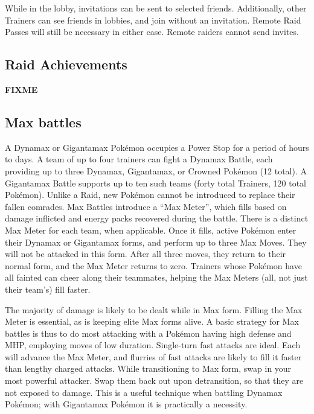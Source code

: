 While in the lobby, invitations can be sent to selected friends.
Additionally, other Trainers can see friends in lobbies, and join without an invitation.
Remote Raid Passes will still be necessary in either case.
Remote raiders cannot send invites.

\subsection{Raid Achievements}
\label{subsec:raidachievements}
\textbf{FIXME}

\subsection{Max battles}
\label{sec:maxbattles}
A Dynamax or Gigantamax Pokémon occupies a Power Stop for a period of hours to days.
A team of up to four trainers can fight a Dynamax Battle, each providing up to
  three Dynamax, Gigantamax, or Crowned Pokémon (12 total).
A Gigantamax Battle supports up to ten such teams (forty total Trainers, 120 total Pokémon).
Unlike a Raid, new Pokémon cannot be introduced to replace their fallen comrades.
Max Battles introduce a ``Max Meter'', which fills based on damage inflicted and
  energy packs recovered during the battle.
There is a distinct Max Meter for each team, when applicable.
Once it fills, active Pokémon enter their Dynamax or Gigantamax forms, and perform
  up to three Max Moves.
They will not be attacked in this form.
After all three moves, they return to their normal form, and the Max Meter returns to zero.
Trainers whose Pokémon have all fainted can cheer along their teammates,
  helping the Max Meters (all, not just their team's) fill faster.

The majority of damage is likely to be dealt while in Max form.
Filling the Max Meter is essential, as is keeping elite Max forms alive.
A basic strategy for Max battles is thus to do most attacking with a Pokémon having
  high defense and MHP, employing moves of low duration.
Single-turn fast attacks are ideal.
Each will advance the Max Meter, and flurries of fast attacks are likely to
 fill it faster than lengthy charged attacks.
While transitioning to Max form, swap in your most powerful attacker.
Swap them back out upon detransition, so that they are not exposed to damage.
This is a useful technique when battling Dynamax Pokémon; with Gigantamax Pokémon it is practically a necessity.

